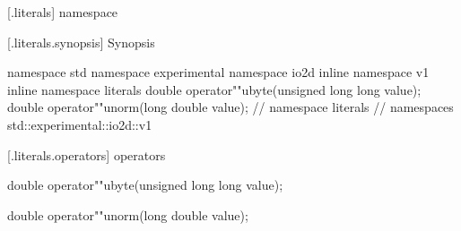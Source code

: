  [\iotwod.literals] { namespace}

 [\iotwod.literals.synopsis] { Synopsis}

\begin{codeblock}
namespace std { namespace experimental { namespace io2d { inline namespace v1 {
  inline namespace literals {
    double operator""ubyte(unsigned long long value);
    double operator""unorm(long double value);
  } // namespace literals
} } } } // namespaces std::experimental::io2d::v1
\end{codeblock}

 [\iotwod.literals.operators] { operators}

%
%
\begin{itemdecl}
double operator""ubyte(unsigned long long value);
\end{itemdecl}
\begin{itemdescr}
	\pnum
	\returns
\end{itemdescr}

%
%
\begin{itemdecl}
double operator""unorm(long double value);
\end{itemdecl}
\begin{itemdescr}
	\pnum
	\returns
\end{itemdescr}
